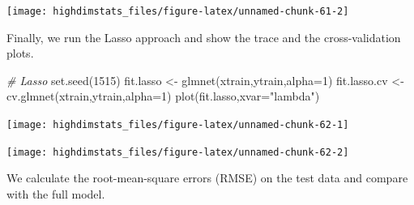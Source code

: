 \documentclass[
]{book}
\newenvironment{Shaded}{\begin{snugshade}}{\end{snugshade}}
\newcommand{\AttributeTok}[1]{\textcolor[rgb]{0.77,0.63,0.00}{#1}}
\newcommand{\CommentTok}[1]{\textcolor[rgb]{0.56,0.35,0.01}{\textit{#1}}}
\newcommand{\DecValTok}[1]{\textcolor[rgb]{0.00,0.00,0.81}{#1}}
\newcommand{\FunctionTok}[1]{\textcolor[rgb]{0.00,0.00,0.00}{#1}}
\newcommand{\NormalTok}[1]{#1}
\newcommand{\OtherTok}[1]{\textcolor[rgb]{0.56,0.35,0.01}{#1}}
\newcommand{\StringTok}[1]{\textcolor[rgb]{0.31,0.60,0.02}{#1}}
\begin{document}
\begin{center}\texttt{[image: highdimstats\_files/figure-latex/unnamed-chunk-61-2]} \end{center}

Finally, we run the Lasso approach and show the trace and the cross-validation plots.

\begin{Shaded}
\begin{Highlighting}[]
\CommentTok{\# Lasso}
\FunctionTok{set.seed}\NormalTok{(}\DecValTok{1515}\NormalTok{)}
\NormalTok{fit.lasso }\OtherTok{\textless{}{-}} \FunctionTok{glmnet}\NormalTok{(xtrain,ytrain,}\AttributeTok{alpha=}\DecValTok{1}\NormalTok{)}
\NormalTok{fit.lasso.cv }\OtherTok{\textless{}{-}} \FunctionTok{cv.glmnet}\NormalTok{(xtrain,ytrain,}\AttributeTok{alpha=}\DecValTok{1}\NormalTok{)}
\FunctionTok{plot}\NormalTok{(fit.lasso,}\AttributeTok{xvar=}\StringTok{"lambda"}\NormalTok{)}
\end{Highlighting}
\end{Shaded}

\begin{center}\texttt{[image: highdimstats\_files/figure-latex/unnamed-chunk-62-1]} \end{center}

\begin{Shaded}
\end{Shaded}

\begin{center}\texttt{[image: highdimstats\_files/figure-latex/unnamed-chunk-62-2]} \end{center}

We calculate the root-mean-square errors (RMSE) on the test data and compare with the full model.
\end{document}

